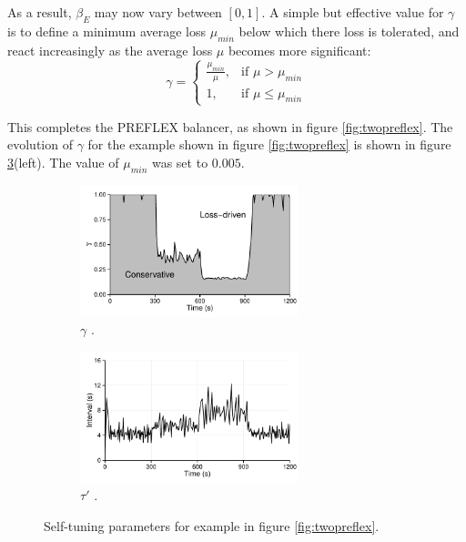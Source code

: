 As a result, $\beta_E$ may now vary between $[0,1]$. 
A simple but effective value for $\gamma$ is to define a minimum average loss $\mu_{min}$ below which there loss is tolerated, and react increasingly as the average loss $\mu$ becomes more significant:
\begin{equation}
\gamma = 
\begin{cases} 
\frac{\mu_{min}}{\mu}, & \mbox{if }\mu > \mu_{min}\\
1, & \mbox{if }\mu \leq \mu_{min}
\end{cases}
\end{equation}

This completes the \ac{PREFLEX} balancer, as shown in figure \ref{fig:twopreflex}. 
The evolution of $\gamma$ for the example shown in figure \ref{fig:twopreflex} is shown in figure \ref{fig:tune}(left). 
The value of $\mu_{min}$ was set to $0.005$.

\begin{figure}
    \begin{subfigure}[b]{.5\linewidth}
        \centering
        \includegraphics[width=2.5in]{figures/cate/gamma}
        \caption{$\gamma$ \label{fig:gamma}.}
    \end{subfigure}
    \begin{subfigure}[b]{.5\linewidth}
        \centering
        \includegraphics[width=2.5in]{figures/cate/tau}
        \caption{$\tau'$ \label{fig:tau}.}
    \end{subfigure}
    \caption[Parameters $\gamma$ and $\tau'$]{Self-tuning parameters for example in figure \ref{fig:twopreflex}.}
    \label{fig:tune}
\end{figure}

